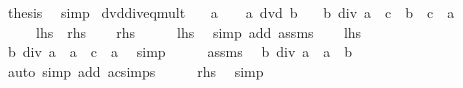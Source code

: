 \begin{isabellebody}
\ {\isacharquery}{\kern0pt}thesis\ \isamarkupfalse%
\ simp\isanewline
{}\isamarkupfalse%
%
\endisatagproof
{\isafoldproof}%
%
\isadelimproof
\isanewline
%
\endisadelimproof
\isanewline
{}\isamarkupfalse%
\ dvd{\isacharunderscore}{\kern0pt}div{\isacharunderscore}{\kern0pt}eq{\isacharunderscore}{\kern0pt}mult{\isacharcolon}{\kern0pt}\isanewline
\ \ \ {\isachardoublequoteopen}a\ {\isasymnoteq}\ {}{\isachardoublequoteclose}\ \ {\isachardoublequoteopen}a\ dvd\ b{\isachardoublequoteclose}\isanewline
\ \ \ {\isachardoublequoteopen}b\ div\ a\ {\isacharequal}{\kern0pt}\ c\ {\isasymlongleftrightarrow}\ b\ {\isacharequal}{\kern0pt}\ c\ {\isacharasterisk}{\kern0pt}\ a{\isachardoublequoteclose}\isanewline
\ \ \ \ {\isacharparenleft}{\kern0pt}\ {\isachardoublequoteopen}{\isacharquery}{\kern0pt}lhs\ {\isasymlongleftrightarrow}\ {\isacharquery}{\kern0pt}rhs{\isachardoublequoteclose}{\isacharparenright}{\kern0pt}\isanewline
%
\isadelimproof
%
\endisadelimproof
%
\isatagproof
{}\isamarkupfalse%
\isanewline
\ \ \isamarkupfalse%
\ {\isacharquery}{\kern0pt}rhs\isanewline
\ \ \isamarkupfalse%
\ \isamarkupfalse%
\ {\isacharquery}{\kern0pt}lhs\ \isamarkupfalse%
\ {\isacharparenleft}{\kern0pt}simp\ add{\isacharcolon}{\kern0pt}\ assms{\isacharparenright}{\kern0pt}\isanewline
{}\isamarkupfalse%
\isanewline
\ \ \isamarkupfalse%
\ {\isacharquery}{\kern0pt}lhs\isanewline
\ \ \isamarkupfalse%
\ \isamarkupfalse%
\ {\isachardoublequoteopen}b\ div\ a\ {\isacharasterisk}{\kern0pt}\ a\ {\isacharequal}{\kern0pt}\ c\ {\isacharasterisk}{\kern0pt}\ a{\isachardoublequoteclose}\ \isamarkupfalse%
\ simp\isanewline
\ \ \isamarkupfalse%
\ \isamarkupfalse%
\ assms\ \isamarkupfalse%
\ {\isachardoublequoteopen}b\ div\ a\ {\isacharasterisk}{\kern0pt}\ a\ {\isacharequal}{\kern0pt}\ b{\isachardoublequoteclose}\isanewline
\ \ \ \ \isamarkupfalse%
\ {\isacharparenleft}{\kern0pt}auto\ simp\ add{\isacharcolon}{\kern0pt}\ ac{\isacharunderscore}{\kern0pt}simps{\isacharparenright}{\kern0pt}\isanewline
\ \ \isamarkupfalse%
\ \isamarkupfalse%
\ {\isacharquery}{\kern0pt}rhs\ \isamarkupfalse%
\ simp\isanewline
{}\isamarkupfalse%
%
\endisatagproof
{\isafoldproof}%
%
\isadelimproof
\isanewline

\end{isabellebody}
